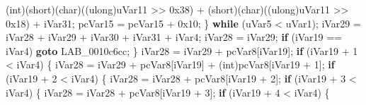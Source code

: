 \documentclass[
]{article}
\newenvironment{Shaded}{}{}
\newcommand{\BaseNTok}[1]{\textcolor[rgb]{0.25,0.63,0.44}{#1}}
\newcommand{\ControlFlowTok}[1]{\textcolor[rgb]{0.00,0.44,0.13}{\textbf{#1}}}
\newcommand{\DataTypeTok}[1]{\textcolor[rgb]{0.56,0.13,0.00}{#1}}
\newcommand{\DecValTok}[1]{\textcolor[rgb]{0.25,0.63,0.44}{#1}}
\newcommand{\ExtensionTok}[1]{#1}
\newcommand{\NormalTok}[1]{#1}
\newcommand{\OperatorTok}[1]{\textcolor[rgb]{0.40,0.40,0.40}{#1}}
\begin{document}
\begin{Shaded}
\begin{Highlighting}[]
                 \OperatorTok{(}\DataTypeTok{int}\OperatorTok{)(}\DataTypeTok{short}\OperatorTok{)(}\DataTypeTok{char}\OperatorTok{)((}\ExtensionTok{ulong}\OperatorTok{)}\NormalTok{uVar11 }\OperatorTok{\textgreater{}\textgreater{}} \BaseNTok{0x38}\OperatorTok{)} \OperatorTok{+}
                 \OperatorTok{(}\DataTypeTok{short}\OperatorTok{)(}\DataTypeTok{char}\OperatorTok{)((}\ExtensionTok{ulong}\OperatorTok{)}\NormalTok{uVar11 }\OperatorTok{\textgreater{}\textgreater{}} \BaseNTok{0x18}\OperatorTok{)} \OperatorTok{+}\NormalTok{ iVar31}\OperatorTok{;}
\NormalTok{        pcVar15 }\OperatorTok{=}\NormalTok{ pcVar15 }\OperatorTok{+} \BaseNTok{0x10}\OperatorTok{;}
      \OperatorTok{\}} \ControlFlowTok{while} \OperatorTok{(}\NormalTok{uVar5 }\OperatorTok{\textless{}}\NormalTok{ uVar1}\OperatorTok{);}
\NormalTok{      iVar29 }\OperatorTok{=}\NormalTok{ iVar28 }\OperatorTok{+}\NormalTok{ iVar29 }\OperatorTok{+}\NormalTok{ iVar30 }\OperatorTok{+}\NormalTok{ iVar31 }\OperatorTok{+}\NormalTok{ iVar4}\OperatorTok{;}
\NormalTok{      iVar28 }\OperatorTok{=}\NormalTok{ iVar29}\OperatorTok{;}
      \ControlFlowTok{if} \OperatorTok{(}\NormalTok{iVar19 }\OperatorTok{==}\NormalTok{ iVar4}\OperatorTok{)} \ControlFlowTok{goto}\NormalTok{ LAB\_0010c6cc}\OperatorTok{;}
    \OperatorTok{\}}
\NormalTok{    iVar28 }\OperatorTok{=}\NormalTok{ iVar29 }\OperatorTok{+}\NormalTok{ pcVar8}\OperatorTok{[}\NormalTok{iVar19}\OperatorTok{];}
    \ControlFlowTok{if} \OperatorTok{(}\NormalTok{iVar19 }\OperatorTok{+} \DecValTok{1} \OperatorTok{\textless{}}\NormalTok{ iVar4}\OperatorTok{)} \OperatorTok{\{}
\NormalTok{      iVar28 }\OperatorTok{=}\NormalTok{ iVar29 }\OperatorTok{+}\NormalTok{ pcVar8}\OperatorTok{[}\NormalTok{iVar19}\OperatorTok{]} \OperatorTok{+} \OperatorTok{(}\DataTypeTok{int}\OperatorTok{)}\NormalTok{pcVar8}\OperatorTok{[}\NormalTok{iVar19 }\OperatorTok{+} \DecValTok{1}\OperatorTok{];}
      \ControlFlowTok{if} \OperatorTok{(}\NormalTok{iVar19 }\OperatorTok{+} \DecValTok{2} \OperatorTok{\textless{}}\NormalTok{ iVar4}\OperatorTok{)} \OperatorTok{\{}
\NormalTok{        iVar28 }\OperatorTok{=}\NormalTok{ iVar28 }\OperatorTok{+}\NormalTok{ pcVar8}\OperatorTok{[}\NormalTok{iVar19 }\OperatorTok{+} \DecValTok{2}\OperatorTok{];}
        \ControlFlowTok{if} \OperatorTok{(}\NormalTok{iVar19 }\OperatorTok{+} \DecValTok{3} \OperatorTok{\textless{}}\NormalTok{ iVar4}\OperatorTok{)} \OperatorTok{\{}
\NormalTok{          iVar28 }\OperatorTok{=}\NormalTok{ iVar28 }\OperatorTok{+}\NormalTok{ pcVar8}\OperatorTok{[}\NormalTok{iVar19 }\OperatorTok{+} \DecValTok{3}\OperatorTok{];}
          \ControlFlowTok{if} \OperatorTok{(}\NormalTok{iVar19 }\OperatorTok{+} \DecValTok{4} \OperatorTok{\textless{}}\NormalTok{ iVar4}\OperatorTok{)} \OperatorTok{\{}

\end{Highlighting}
\end{Shaded}
\end{document}

